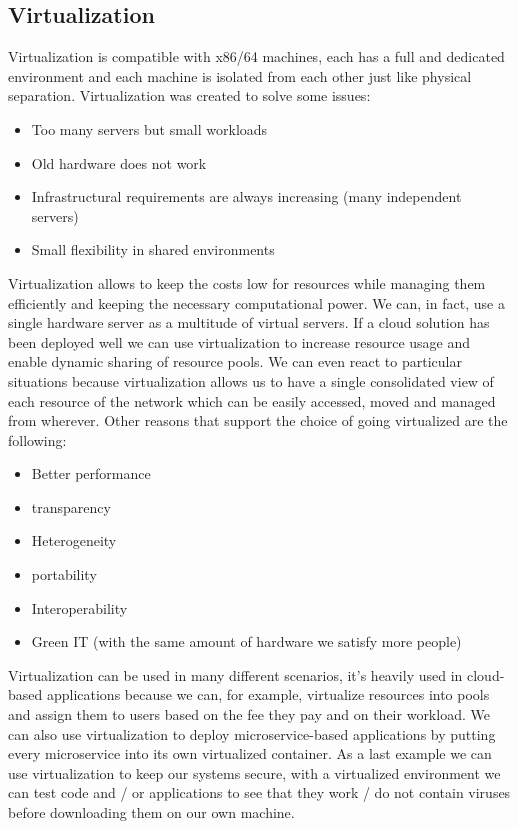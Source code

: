 \subsection{Virtualization}
Virtualization is compatible with x86/64 machines, each has a full and dedicated environment and each machine is isolated from each other just like physical separation. \n
Virtualization was created to solve some issues:
\begin{itemize}
    \item Too many servers but small workloads
    \item Old hardware does not work
    \item Infrastructural requirements are always increasing (many independent servers)
    \item Small flexibility in shared environments
\end{itemize}
Virtualization allows to keep the costs low for resources while managing them efficiently and keeping the necessary computational power. We can, in fact, use a single hardware server as a multitude of virtual servers. \n
If a cloud solution has been deployed well we can use virtualization to increase resource usage and enable dynamic sharing of resource pools. We can even react to particular situations because virtualization allows us to have a single consolidated view of each resource of the network which can be easily accessed, moved and managed from wherever. \n
Other reasons that support the choice of going virtualized are the following:
\begin{itemize}
    \item Better performance
    \item transparency
    \item Heterogeneity
    \item portability
    \item Interoperability
    \item Green IT (with the same amount of hardware we satisfy more people)
\end{itemize}
Virtualization can be used in many different scenarios, it's heavily used in cloud-based applications because we can, for example, virtualize resources into pools and assign them to users based on the fee they pay and on their workload. \n
We can also use virtualization to deploy microservice-based applications by putting every microservice into its own virtualized container. \n
As a last example we can use virtualization to keep our systems secure, with a virtualized environment we can test code and / or applications to see that they work / do not contain viruses before downloading them on our own machine. \n
